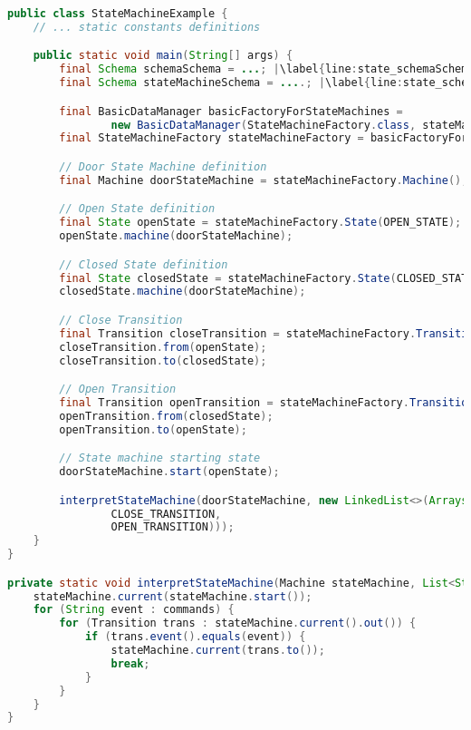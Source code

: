 \begin{sourcecode} [H]
	\begin{lstlisting}[language=Java, escapechar=|]
public class StateMachineExample {
	// ... static constants definitions

	public static void main(String[] args) {
		final Schema schemaSchema = ...; |\label{line:state_schemaSchema}|
		final Schema stateMachineSchema = ....; |\label{line:state_schemaMachineSchema}|

		final BasicDataManager basicFactoryForStateMachines = 
				new BasicDataManager(StateMachineFactory.class, stateMachineSchema);  |\label{line:state_meaning_full_code}|
		final StateMachineFactory stateMachineFactory = basicFactoryForStateMachines.make();

		// Door State Machine definition
		final Machine doorStateMachine = stateMachineFactory.Machine(); |\label{line:state_machine_creation_basic}|

		// Open State definition
		final State openState = stateMachineFactory.State(OPEN_STATE);
		openState.machine(doorStateMachine);

		// Closed State definition
		final State closedState = stateMachineFactory.State(CLOSED_STATE);
		closedState.machine(doorStateMachine);

		// Close Transition
		final Transition closeTransition = stateMachineFactory.Transition(CLOSE_TRANSITION);
		closeTransition.from(openState);
		closeTransition.to(closedState);

		// Open Transition
		final Transition openTransition = stateMachineFactory.Transition(OPEN_TRANSITION);
		openTransition.from(closedState);
		openTransition.to(openState);

		// State machine starting state
		doorStateMachine.start(openState);

		interpretStateMachine(doorStateMachine, new LinkedList<>(Arrays.asList(
		        CLOSE_TRANSITION,
		        OPEN_TRANSITION)));
	}
}

private static void interpretStateMachine(Machine stateMachine, List<String> commands) { |\label{line:state_machine_interpreter}|
    stateMachine.current(stateMachine.start());
    for (String event : commands) {
        for (Transition trans : stateMachine.current().out()) {
            if (trans.event().equals(event)) {
                stateMachine.current(trans.to());
                break;
            }
        }
    }
}   
	\end{lstlisting}
	\caption{Door state machine}
	\label{lst:Door_state_machine}
\end{sourcecode}


